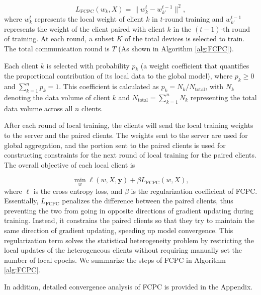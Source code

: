 \documentclass[journal,twoside,web]{ieeecolor}
\begin{document}
\begin{equation}
L_{\text{FCPC}}(w_k, X) = \|w_k^t- w_{k'}^{t-1}\|^2 ,
\end{equation}
where \( w_k^t \) represents the local weight of client $k$ in $t$-round training and \( w_{k'}^{t-1}\) represents the weight of the client paired with client $k$ in the $(t-1)$-th round of training.
At each round, a subset $K$ of the total devices is selected to train. The total communication round is $T$ (As shown in Algorithm \ref{alg:FCPC}).

Each client $k$ is selected with probability $p_k$ (a weight coefficient that quantifies the proportional contribution of its local data to the global model), where $p_k \geq 0$ and $\sum_{k=1}^n p_k = 1$. This coefficient is calculated as $p_k = N_k / N_{\text{total}}$, with $N_k$ denoting the data volume of client $k$ and $N_{\text{total}} = \sum_{k=1}^n N_k$ representing the total data volume across all $n$ clients.

After each round of local training, the clients will send the local training weights to the server and the paired clients. The weights sent to the server are used for global aggregation, and the portion sent to the paired clients is used for constructing constraints for the next round of local training for the paired clients. The overall objective of each local client is

\begin{equation}
\min_{w} \ell(w, X, \mathbf{y}) + \beta L_{\text{FCPC}}(w, X),
\label{equa:beta}
\end{equation}
where \(\ell\) is the cross entropy loss, and $\beta$ is the regularization coefficient of FCPC. Essentially, $L_{\text{FCPC}}$ penalizes the difference between the paired clients, thus preventing the two from going in opposite directions of gradient updating during training. Instead, it constrains the paired clients so that they try to maintain the same direction of gradient updating, speeding up model convergence. This regularization term solves the statistical heterogeneity problem by restricting the local updates of the heterogeneous clients without requiring manually set the number of local epochs. We summarize the steps of FCPC in Algorithm \ref{alg:FCPC}.

In addition, detailed convergence analysis of FCPC is provided in the Appendix.
\end{document}
